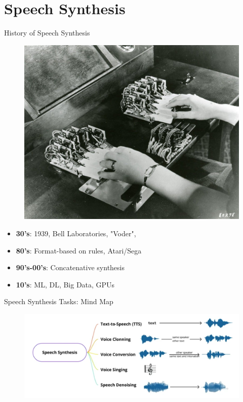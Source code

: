 \section{Speech Synthesis}
\begin{frame}{History of Speech Synthesis}
	\begin{figure}
		\centering
		\includegraphics[width=0.6\linewidth]{figs/voder.png}
	\end{figure}
	\begin{itemize}
		\item \textbf{30's}: 1939, Bell Laboratories, "Voder",
		\item \textbf{80's}: Format-based on rules, Atari/Sega
		\item \textbf{90's-00's}: Concatenative synthesis
		\item \textbf{10's}: ML, DL, Big Data, GPUs
	\end{itemize}
\end{frame}
\begin{frame}{Speech Synthesis Tasks: Mind Map}
	\begin{figure}
		\centering
		\includegraphics[width=0.99\linewidth]{figs/tasks_3.png}
	\end{figure}
\end{frame}
